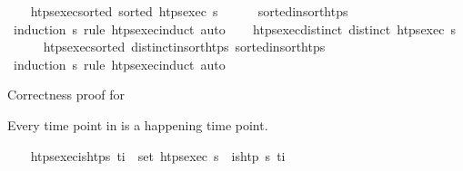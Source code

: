 \begin{isabellebody}
\endisatagproof
{\isafoldproof}%
%
\isadelimproof
\isanewline
%
\endisadelimproof
\isanewline
\ \ \isamarkupfalse%
\ htps{\isacharunderscore}{\kern0pt}exec{\isacharunderscore}{\kern0pt}sorted{\isacharcolon}{\kern0pt}\ {\isachardoublequoteopen}sorted\ {\isacharparenleft}{\kern0pt}htps{\isacharunderscore}{\kern0pt}exec\ {\isasympi}s{\isacharparenright}{\kern0pt}{\isachardoublequoteclose}\isanewline
%
\isadelimproof
\ \ \ \ %
\endisadelimproof
%
\isatagproof
{}\isamarkupfalse%
\ sorted{\isacharunderscore}{\kern0pt}insort{\isacharunderscore}{\kern0pt}htps\ \isamarkupfalse%
\ {\isacharparenleft}{\kern0pt}induction\ {\isasympi}s\ rule{\isacharcolon}{\kern0pt}\ htps{\isacharunderscore}{\kern0pt}exec{\isachardot}{\kern0pt}induct{\isacharparenright}{\kern0pt}\ auto%
\endisatagproof
{\isafoldproof}%
%
\isadelimproof
\isanewline
%
\endisadelimproof
\isanewline
\ \ \isamarkupfalse%
\ htps{\isacharunderscore}{\kern0pt}exec{\isacharunderscore}{\kern0pt}distinct{\isacharcolon}{\kern0pt}\ {\isachardoublequoteopen}distinct\ {\isacharparenleft}{\kern0pt}htps{\isacharunderscore}{\kern0pt}exec\ {\isasympi}s{\isacharparenright}{\kern0pt}{\isachardoublequoteclose}\isanewline
%
\isadelimproof
\ \ \ \ %
\endisadelimproof
%
\isatagproof
{}\isamarkupfalse%
\ htps{\isacharunderscore}{\kern0pt}exec{\isacharunderscore}{\kern0pt}sorted\ distinct{\isacharunderscore}{\kern0pt}insort{\isacharunderscore}{\kern0pt}htps\ sorted{\isacharunderscore}{\kern0pt}insort{\isacharunderscore}{\kern0pt}htps\isanewline
\ \ \ \ \isamarkupfalse%
\ {\isacharparenleft}{\kern0pt}induction\ {\isasympi}s\ rule{\isacharcolon}{\kern0pt}\ htps{\isacharunderscore}{\kern0pt}exec{\isachardot}{\kern0pt}induct{\isacharparenright}{\kern0pt}\ auto%
\endisatagproof
{\isafoldproof}%
%
\isadelimproof
%
\endisadelimproof
%
\begin{isamarkuptext}%
Correctness proof for %
\end{isamarkuptext}\isamarkuptrue%
%
\begin{isamarkuptext}%
Every time point in  is a happening time point.%
\end{isamarkuptext}\isamarkuptrue%
\ \ \isamarkupfalse%
\ htps{\isacharunderscore}{\kern0pt}exec{\isacharunderscore}{\kern0pt}is{\isacharunderscore}{\kern0pt}htps{\isacharcolon}{\kern0pt}\ {\isachardoublequoteopen}t\isactrlsub i\ {\isasymin}\ set\ {\isacharparenleft}{\kern0pt}htps{\isacharunderscore}{\kern0pt}exec\ {\isasympi}s{\isacharparenright}{\kern0pt}\ {\isasymLongrightarrow}\ is{\isacharunderscore}{\kern0pt}htp\ {\isasympi}s\ t\isactrlsub i{\isachardoublequoteclose}\isanewline

\end{isabellebody}
